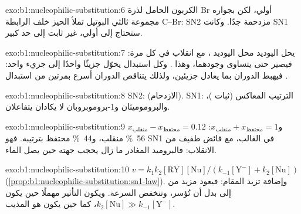 \begin{solution}{exo:b1:nucleophilic-substitution:6}
الكربون الحامل لذرة Br أولي، لكن بجواره مجموعة ثالثي البوتيل تملأ
الحيز خلف الرابطة C--Br:  SN2 مزدحمة
جدًا. وكانت SN1 ستحتاج إلى  أولي، غير ثابت إلى حد كبير.
\end{solution}

\begin{solution}{exo:b1:nucleophilic-substitution:7}
يحل اليوديد محل اليوديد ، مع انقلاب في كل مرة: فيصير 
 حتى يتساوى وجودهما، وهذا . وكل
استبدال يحوّل جزيئًا  واحدًا إلى جزيء  واحد: فيهبط الدوران
بما يعادل جزيئين، ولذلك يتناقص الدوران أسرع بمرتين من
استبدال .
\end{solution}

\begin{solution}{exo:b1:nucleophilic-substitution:8}
SN2:  (الازدحام). SN1: الترتيب المعاكس (ثبات
)، والبروموميثان و1-بروموبروبان لا يكادان يتفاعلان.
\end{solution}

\begin{solution}{exo:b1:nucleophilic-substitution:9}
$x_{\text{منقلب}} - x_{\text{محتفظ}} = 0.12$ و$x_{\text{منقلب}} + x_{\text{محتفظ}} = 1$:
\qty{56}{\percent} منقلب، و\qty{44}{\percent} محتفظ بترتيبه. فهو  SN1
في الغالب، مع فائض طفيف من الانقلاب: فالبروميد المغادر
ما زال يحجب جهته حين يصل الماء.
\end{solution}

\begin{solution}{exo:b1:nucleophilic-substitution:10}
$v = k_1k_2[\mathrm{RY}][\mathrm{Nu}]/(k_{-1}[\mathrm{Y^-}] + k_2[\mathrm{Nu}])$
(\cref{prop:b1:nucleophilic-substitution:sn1-law}). وإضافة 
تزيد المقام: فيعود مزيد من  إلى 
بدل أن تُؤسر، وتنخفض السرعة. ويكون التأثير مهملًا حين يكون
$k_2[\mathrm{Nu}] \gg k_{-1}[\mathrm{Y^-}]$، كما حين يكون  هو
المذيب.
\end{solution}


